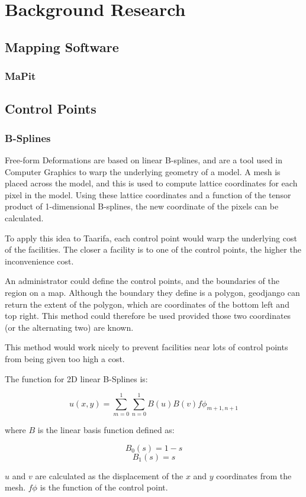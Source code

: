 \chapter{Background Research}
\section{Mapping Software}
\subsection{MaPit ~\cite{mapit}}
\section{Control Points}
\subsection{B-Splines}
Free-form Deformations are based on linear B-splines, and are a tool used in Computer Graphics to warp the underlying geometry of a model. A mesh is placed across the model, and this is used to compute lattice coordinates for each pixel in the model. Using these lattice coordinates and a function of the tensor product of 1-dimensional B-splines, the new coordinate of the pixels can be calculated.

To apply this idea to Taarifa, each control point would warp the underlying cost of the facilities. The closer a facility is to one of the control points, the higher the inconvenience cost.

An administrator could define the control points, and the boundaries of the region on a map. Although the boundary they define is a polygon, geodjango can return the extent of the polygon, which are coordinates of the bottom left and top right. This method could therefore be used provided those two coordinates (or the alternating two) are known.

This method would work nicely to prevent facilities near lots of control points from being given too high a cost.

The function for 2D linear B-Splines is:

$$u(x, y) = \sum\limits_{m=0}^1\sum\limits_{n=0}^1 B(u)B(v)f\phi_{m+1, n+1}$$

where $B$ is the linear basis function defined as:

$$B_0(s) = 1 - s$$
$$B_1(s) = s$$

$u$ and $v$ are calculated as the displacement of the $x$ and $y$ coordinates from the mesh. $f\phi$ is the function of the control point.

